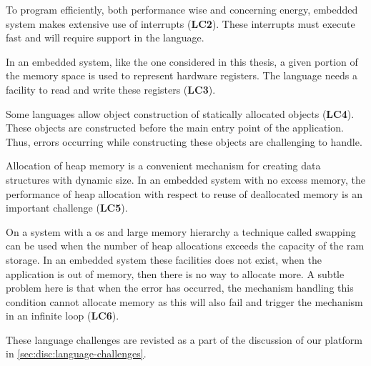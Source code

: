 To program efficiently, both performance wise and concerning energy, embedded system makes extensive use of interrupts (\textbf{LC2}).
These interrupts must execute fast and will require support in the language.

In an embedded system, like the one considered in this thesis, a given portion of the memory space is used to represent hardware registers.
The language needs a facility to read and write these registers (\textbf{LC3}).

Some languages allow object construction of statically allocated objects (\textbf{LC4}).
These objects are constructed before the main entry point of the application.
Thus, errors occurring while constructing these objects are challenging to handle.

Allocation of heap memory is a convenient mechanism for creating data structures with dynamic size.
In an embedded system with no excess memory, the performance of heap allocation with respect to reuse of deallocated memory is an important challenge (\textbf{LC5}).

On a system with a \gls{os} and large memory hierarchy a technique called swapping can be used when the number of heap allocations exceeds the capacity of the \gls{ram} storage.
In an embedded system these facilities does not exist, when the application is out of memory, then there is no way to allocate more.
A subtle problem here is that when the error has occurred, the mechanism handling this condition cannot allocate memory as this will also fail and trigger the mechanism in an infinite loop (\textbf{LC6}).

These language challenges are revisted as a part of the discussion of our platform in \autoref{sec:disc:language-challenges}.
